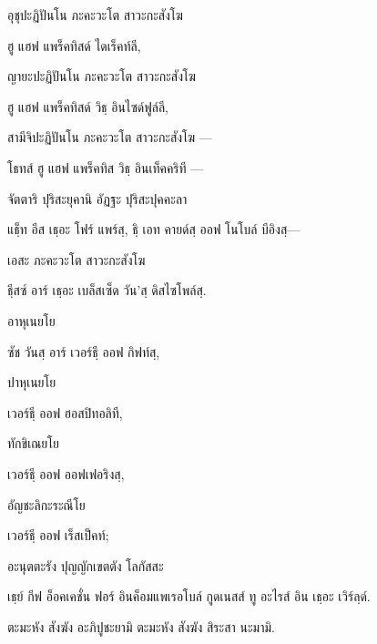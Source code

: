 อุชุปะฏิปันโน ภะคะวะโต สาวะกะสังโฆ

\begin{english}
ฮู แฮฟ แพร็คทิสด์ ไดเร็คท์ลี,
\end{english}

ญายะปะฏิปันโน ภะคะวะโต สาวะกะสังโฆ

\begin{english}
ฮู แฮฟ แพร็คทิสด์ วิธฺ อินไซด์ฟูล์ลี,
\end{english}

สามีจิปะฏิปันโน ภะคะวะโต สาวะกะสังโฆ —

\begin{english}
โธทส์ ฮู แฮฟ แพร็คทิส วิธฺ อินเท็คคริที —
\end{english}

จัตตาริ ปุริสะยุคานิ อัฏฐะ ปุริสะปุคคะลา

\begin{english}
แธฺ็ท อีส เธฺอะ โฟร์ แพร์สฺ, ธฺิ เอท คายด์สฺ ออฟ โนโบล์ บีอิงสฺ—
\end{english}

เอสะ ภะคะวะโต สาวะกะสังโฆ

\begin{english}
ธฺีสซ์ อาร์ เธฺอะ เบล็สเซ็ด วัน’สฺ ดิสไซโพล์สฺ.
\end{english}

อาหุเนยโย

\begin{english}
ซัช วันสฺ อาร์ เวอร์ธฺี ออฟ กิฟท์สฺ,
\end{english}

ปาหุเนยโย

\begin{english}
เวอร์ธฺี ออฟ ฮอสปิทอลิที,
\end{english}

ทักขิเณยโย

\begin{english}
เวอร์ธฺี ออฟ ออฟเฟอริงสฺ,
\end{english}

อัญชะลิกะระณีโย

\begin{english}
 เวอร์ธฺี ออฟ เร็สเป็คท์;
\end{english}

อะนุตตะรัง ปุญญักเขตตัง โลกัสสะ

\begin{english}
เธฺย์ กีฟ อ็อคเคชั่น ฟอร์ อินค็อมแพเรอโบล์ กูดเนสส์ ทู อะไรส์ อิน เธฺอะ เวิร์ลฺด์.
\end{english}

ตะมะหัง สังฆัง อะภิปูชะยามิ ตะมะหัง สังฆัง สิระสา นะมามิ.

